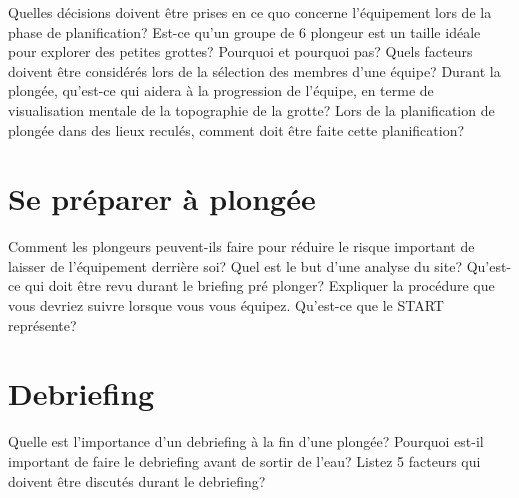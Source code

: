\documentclass[english,1pt,a4paper]{article}
\begin{document}
\begin{outline}
		\1 Quelles décisions doivent être prises en ce quo concerne l’équipement lors de la phase de planification?	\vspace{2cm}
		\1 Est-ce qu’un groupe de 6 plongeur est un taille idéale pour explorer des petites grottes? Pourquoi et pourquoi pas?	\vspace{2cm}
		\1 Quels facteurs doivent être considérés lors de la sélection des membres d’une équipe?	\vspace{2cm}
		\1 Durant la plongée, qu’est-ce qui aidera à la progression de l’équipe, en terme de visualisation mentale de la topographie de la grotte?	\vspace{2cm}
		\1 Lors de la planification de plongée dans des lieux reculés, comment doit être faite cette planification?	\vspace{2cm}
	\end{outline}
	\pagebreak	

	\section{Se préparer à plongée}

	\begin{outline}
		\1 Comment les plongeurs peuvent-ils faire pour réduire le risque important de laisser de l’équipement derrière soi?	\vspace{2cm}
		\1 Quel est le but d’une analyse du site?	\vspace{2cm}
		\1 Qu’est-ce qui doit être revu durant le briefing pré plonger?	\vspace{2cm}
		\1 Expliquer la procédure que vous devriez suivre lorsque vous vous équipez.	\vspace{2cm}
		\1 Qu’est-ce que le START représente?	\vspace{2cm}
	\end{outline}
	\pagebreak	

	\section{Debriefing}

	\begin{outline}
		\1 Quelle est l’importance d’un debriefing à la fin d’une plongée?	\vspace{2cm}
		\1 Pourquoi est-il important de faire le debriefing avant de sortir de l’eau?	\vspace{2cm}
		\1 Listez 5 facteurs qui doivent être discutés durant le debriefing?	\vspace{2cm}
	\end{outline}
\end{document}
